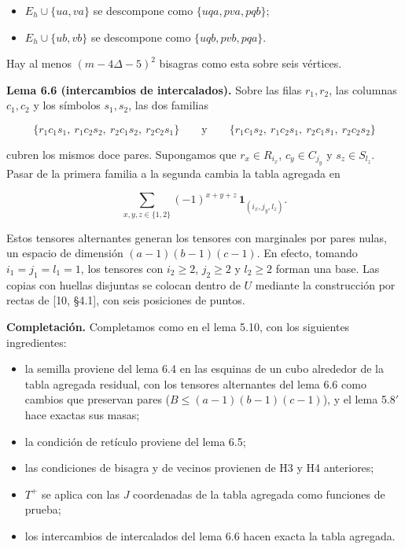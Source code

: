 \documentclass[spanish,11pt,a4paper]{article}
\providecommand{\tightlist}{\setlength{\itemsep}{0pt}\setlength{\parskip}{0pt}}
\begin{document}
\begin{itemize}
\tightlist
\item
  \(E_h\cup\{ua,va\}\) se descompone como \(\{uqa,pva,pqb\}\);
\item
  \(E_h\cup\{ub,vb\}\) se descompone como \(\{uqb,pvb,pqa\}\).
\end{itemize}

Hay al menos \((m-4\Delta-5)^2\) bisagras como esta sobre seis vértices.

\textbf{Lema 6.6 (intercambios de intercalados).} Sobre las filas \(r_1,r_2\), las columnas \(c_1,c_2\) y los símbolos \(s_1,s_2\), las dos familias

\nopagebreak[4]
\[\{r_1c_1s_1,\ r_1c_2s_2,\ r_2c_1s_2,\ r_2c_2s_1\}\qquad\text{y}\qquad\{r_1c_1s_2,\ r_1c_2s_1,\ r_2c_1s_1,\ r_2c_2s_2\}\]

cubren los mismos doce pares. Supongamos que \(r_x\in R_{i_x}\), \(c_y\in C_{j_y}\) y \(s_z\in S_{l_z}\). Pasar de la primera familia a la segunda cambia la tabla agregada en

\nopagebreak[4]
\[\sum_{x,y,z\in\{1,2\}}(-1)^{x+y+z}\,\mathbf 1_{(i_x,j_y,l_z)}.\]

Estos tensores alternantes generan los tensores con marginales por pares nulas, un espacio de dimensión \((a-1)(b-1)(c-1)\). En efecto, tomando \(i_1=j_1=l_1=1\), los tensores con \(i_2\ge2\), \(j_2\ge2\) y \(l_2\ge2\) forman una base. Las copias con huellas disjuntas se colocan dentro de \(U\) mediante la construcción por rectas de {[}10, §4.1{]}, con seis posiciones de puntos.

\textbf{Completación.} Completamos como en el lema 5.10, con los siguientes ingredientes:

\begin{itemize}
\tightlist
\item
  la semilla proviene del lema 6.4 en las esquinas de un cubo alrededor de la tabla agregada residual, con los tensores alternantes del lema 6.6 como cambios que preservan pares (\(B\le(a-1)(b-1)(c-1)\)), y el lema 5.8\('\) hace exactas sus masas;
\item
  la condición de retículo proviene del lema 6.5;
\item
  las condiciones de bisagra y de vecinos provienen de H3 y H4 anteriores;
\item
  \(T^+\) se aplica con las \(J\) coordenadas de la tabla agregada como funciones de prueba;
\item
  los intercambios de intercalados del lema 6.6 hacen exacta la tabla agregada.
\end{itemize}
\end{document}
